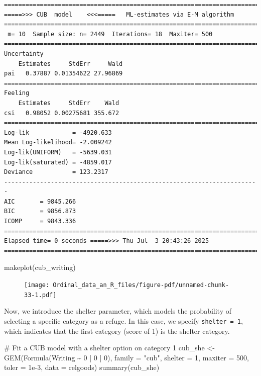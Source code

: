 \documentclass[
  letterpaper,
  DIV=11,
  numbers=noendperiod]{scrartcl}
\newenvironment{Shaded}{\begin{snugshade}}{\end{snugshade}}
\newcommand{\AttributeTok}[1]{\textcolor[rgb]{0.40,0.45,0.13}{#1}}
\newcommand{\CommentTok}[1]{\textcolor[rgb]{0.37,0.37,0.37}{#1}}
\newcommand{\DecValTok}[1]{\textcolor[rgb]{0.68,0.00,0.00}{#1}}
\newcommand{\FloatTok}[1]{\textcolor[rgb]{0.68,0.00,0.00}{#1}}
\newcommand{\FunctionTok}[1]{\textcolor[rgb]{0.28,0.35,0.67}{#1}}
\newcommand{\NormalTok}[1]{\textcolor[rgb]{0.00,0.23,0.31}{#1}}
\newcommand{\OtherTok}[1]{\textcolor[rgb]{0.00,0.23,0.31}{#1}}
\newcommand{\SpecialCharTok}[1]{\textcolor[rgb]{0.37,0.37,0.37}{#1}}
\newcommand{\StringTok}[1]{\textcolor[rgb]{0.13,0.47,0.30}{#1}}
\begin{document}
\begin{verbatim}
======================================================================= 
=====>>> CUB  model    <<<=====   ML-estimates via E-M algorithm   
======================================================================= 
 m= 10  Sample size: n= 2449  Iterations= 18  Maxiter= 500 
======================================================================= 
Uncertainty                                            
    Estimates     StdErr     Wald
pai   0.37887 0.01354622 27.96869
======================================================================= 
Feeling                                            
    Estimates     StdErr    Wald
csi   0.98052 0.00275681 355.672
======================================================================= 
Log-lik            = -4920.633 
Mean Log-likelihood= -2.009242 
Log-lik(UNIFORM)   = -5639.031 
Log-lik(saturated) = -4859.017 
Deviance           = 123.2317 
----------------------------------------------------------------------- 
AIC       = 9845.266 
BIC       = 9856.873 
ICOMP     = 9843.336 
======================================================================= 
Elapsed time= 0 seconds =====>>> Thu Jul  3 20:43:26 2025 
======================================================================= 
\end{verbatim}

\begin{Shaded}
\begin{Highlighting}[]
\FunctionTok{makeplot}\NormalTok{(cub\_writing)}
\end{Highlighting}
\end{Shaded}

\begin{figure}[H]

{\centering \texttt{[image: Ordinal\_data\_an\_R\_files/figure-pdf/unnamed-chunk-33-1.pdf]}

}

\end{figure}

Now, we introduce the shelter parameter, which models the probability of
selecting a specific category as a refuge. In this case, we specify
\texttt{shelter\ =\ 1}, which indicates that the first category (score
of 1) is the shelter category.

\begin{Shaded}
\begin{Highlighting}[]
\CommentTok{\# Fit a CUB model with a shelter option on category 1}
\NormalTok{cub\_she }\OtherTok{\textless{}{-}} \FunctionTok{GEM}\NormalTok{(}\FunctionTok{Formula}\NormalTok{(Writing }\SpecialCharTok{\textasciitilde{}} \DecValTok{0} \SpecialCharTok{|} \DecValTok{0} \SpecialCharTok{|} \DecValTok{0}\NormalTok{), }\AttributeTok{family =} \StringTok{"cub"}\NormalTok{, }\AttributeTok{shelter =} \DecValTok{1}\NormalTok{,}
               \AttributeTok{maxiter =} \DecValTok{500}\NormalTok{, }\AttributeTok{toler =} \FloatTok{1e{-}3}\NormalTok{, }\AttributeTok{data =}\NormalTok{ relgoods)}
\FunctionTok{summary}\NormalTok{(cub\_she)}
\end{Highlighting}
\end{Shaded}
\end{document}
